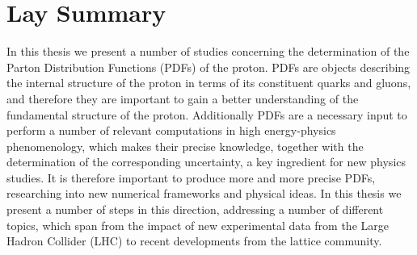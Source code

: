 \chapter*{Lay Summary}
In this thesis we present a number of studies concerning the determination of the
Parton Distribution Functions (PDFs) of the proton. 
PDFs are objects describing the internal structure of the proton in terms of its constituent
quarks and gluons, and therefore they are important to gain a better understanding 
of the fundamental structure of the proton.
Additionally PDFs are a necessary input to perform a number of relevant computations
in high energy-physics phenomenology, which makes
their precise knowledge, together with the determination of the corresponding uncertainty,
a key ingredient for new physics studies. 
It is therefore important to produce more and more precise PDFs,
researching into new numerical frameworks and physical ideas. 
In this thesis we present a number of steps in this direction, addressing a number of different topics,
which span from the impact of new experimental data from the Large Hadron Collider (LHC)
to recent developments from the lattice community.


